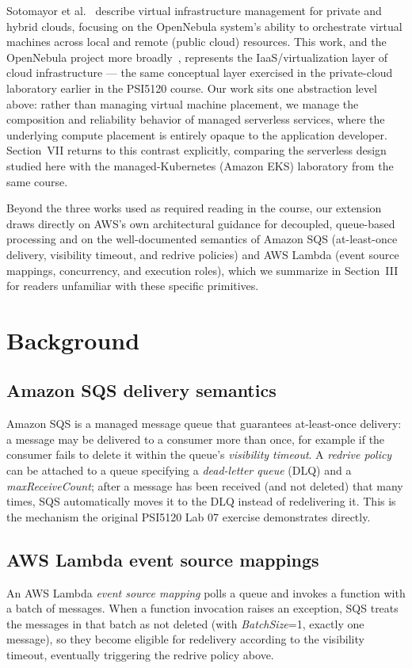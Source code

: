 \documentclass[conference]{IEEEtran}
\begin{document}
Sotomayor et al.~\cite{sotomayor2009} describe virtual infrastructure management for private and hybrid clouds, focusing on the OpenNebula system's ability to orchestrate virtual machines across local and remote (public cloud) resources. This work, and the OpenNebula project more broadly~\cite{opennebula2011}, represents the IaaS/virtualization layer of cloud infrastructure --- the same conceptual layer exercised in the private-cloud laboratory earlier in the PSI5120 course. Our work sits one abstraction level above: rather than managing virtual machine placement, we manage the composition and reliability behavior of managed serverless services, where the underlying compute placement is entirely opaque to the application developer. Section~VII returns to this contrast explicitly, comparing the serverless design studied here with the managed-Kubernetes (Amazon EKS) laboratory from the same course.

Beyond the three works used as required reading in the course, our extension draws directly on AWS's own architectural guidance for decoupled, queue-based processing and on the well-documented semantics of Amazon SQS (at-least-once delivery, visibility timeout, and redrive policies) and AWS Lambda (event source mappings, concurrency, and execution roles), which we summarize in Section~III for readers unfamiliar with these specific primitives.

\section{Background}

\subsection{Amazon SQS delivery semantics}
Amazon SQS is a managed message queue that guarantees at-least-once delivery: a message may be delivered to a consumer more than once, for example if the consumer fails to delete it within the queue's \emph{visibility timeout}. A \emph{redrive policy} can be attached to a queue specifying a \emph{dead-letter queue} (DLQ) and a \emph{maxReceiveCount}; after a message has been received (and not deleted) that many times, SQS automatically moves it to the DLQ instead of redelivering it. This is the mechanism the original PSI5120 Lab 07 exercise demonstrates directly.

\subsection{AWS Lambda event source mappings}
An AWS Lambda \emph{event source mapping} polls a queue and invokes a function with a batch of messages. When a function invocation raises an exception, SQS treats the messages in that batch as not deleted (with \emph{BatchSize}=1, exactly one message), so they become eligible for redelivery according to the visibility timeout, eventually triggering the redrive policy above.
\end{document}
